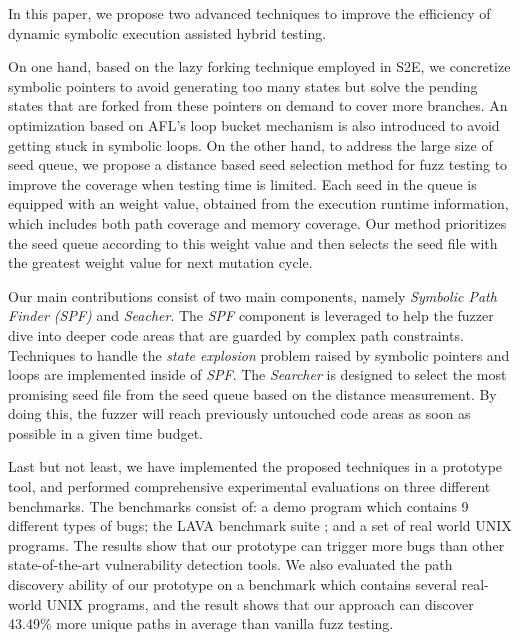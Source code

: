  In this paper, we propose two advanced techniques to improve the efficiency of dynamic symbolic execution assisted hybrid testing.
 
 On one hand, based on the lazy forking technique employed in S2E\cite{chipounov2011s2e}, we concretize symbolic pointers to avoid generating too many states but solve the pending states that are forked from these pointers on demand to cover more branches. An optimization based on AFL's \cite{online:afl} loop bucket mechanism is also introduced to avoid getting stuck in symbolic loops.
 On the other hand, to address the large size of seed queue, 
 we propose a distance based seed selection method for fuzz testing to improve the coverage when testing time is limited. 
 Each seed in the queue is equipped with an weight value, 
 obtained from the execution runtime information,
 which includes both path coverage and memory coverage.
 Our method prioritizes the seed queue according to this weight value and 
 then selects the seed file with the greatest weight value for next mutation cycle.


 Our main contributions consist of two main components, namely \emph{Symbolic Path Finder (SPF)} and \emph{Seacher}. 
 The \emph{SPF} component is leveraged to help the fuzzer dive into deeper code areas 
 that are guarded by complex path constraints. 
 Techniques to handle the \textit{state explosion} problem 
 raised by symbolic pointers and loops are implemented inside of \emph{SPF}. 
 The \emph{Searcher} is designed to select the most promising seed file 
 from the seed queue based on the distance measurement. 
 By doing this, the fuzzer will reach previously untouched code areas as soon as possible in a given time budget. 

 Last but not least,  we have implemented the proposed techniques in a prototype tool,
 and performed comprehensive experimental evaluations on three different benchmarks. The benchmarks consist of: a demo program which contains 9 different types of bugs; the LAVA benchmark suite \cite{dolan2016lava}; and a set of real world UNIX programs. The results show that our prototype can trigger more bugs than other state-of-the-art vulnerability detection tools. We also evaluated the path discovery ability of our prototype on a benchmark which contains several real-world UNIX programs, and the result shows that our approach can discover 43.49\% more unique paths in average than vanilla fuzz testing.


